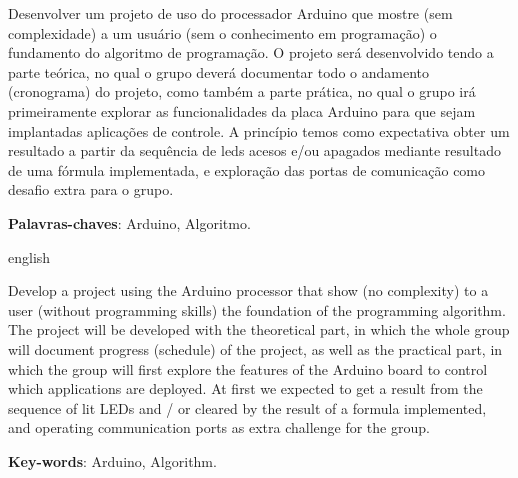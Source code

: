 \begin{resumo}

	Desenvolver um projeto de uso do processador  Arduino que mostre (sem complexidade) a um usuário (sem o conhecimento em programação) o fundamento do algoritmo de programação. O projeto será desenvolvido tendo a parte teórica, no qual o grupo deverá documentar todo o andamento (cronograma) do projeto, como também a parte prática, no qual o grupo irá primeiramente explorar as funcionalidades da placa Arduino para que sejam implantadas aplicações de controle. A princípio temos como expectativa obter um resultado a partir da sequência de leds acesos e/ou apagados mediante resultado de uma fórmula implementada, e exploração das portas de comunicação como desafio extra para o grupo.

 \vspace{\onelineskip}
    
 \noindent
 \textbf{Palavras-chaves}: Arduino, Algoritmo.
\end{resumo}

\begin{resumo}[Abstract]
 \begin{otherlanguage*}{english}
   
	Develop a project using the Arduino processor that show (no complexity) to a user (without programming skills) the foundation of the programming algorithm. The project will be developed with the theoretical part, in which the whole group will document progress (schedule) of the project, as well as the practical part, in which the group will first explore the features of the Arduino board to control which applications are deployed. At first we expected to get a result from the sequence of lit LEDs and / or cleared by the result  of a formula implemented, and operating communication ports as extra challenge for the group. 

   \vspace{\onelineskip}
 
   \noindent 
   \textbf{Key-words}: Arduino, Algorithm.
 \end{otherlanguage*}
\end{resumo}